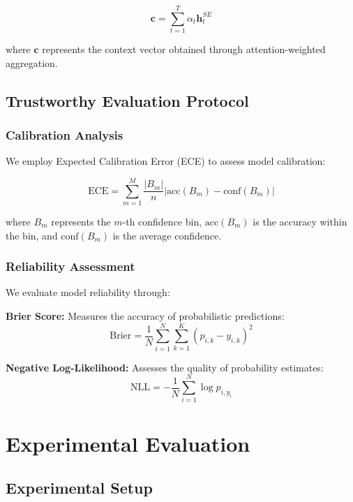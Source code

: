 \documentclass[journal]{IEEEtran}
\begin{document}
\begin{equation}
\mathbf{c} = \sum_{t=1}^{T} \alpha_t \mathbf{h}_t^{SE}
\end{equation}

where $\mathbf{c}$ represents the context vector obtained through attention-weighted aggregation.

\subsection{Trustworthy Evaluation Protocol}

\subsubsection{Calibration Analysis}

We employ Expected Calibration Error (ECE) to assess model calibration:

\begin{equation}
\text{ECE} = \sum_{m=1}^{M} \frac{|B_m|}{n} |\text{acc}(B_m) - \text{conf}(B_m)|
\end{equation}

where $B_m$ represents the $m$-th confidence bin, $\text{acc}(B_m)$ is the accuracy within the bin, and $\text{conf}(B_m)$ is the average confidence.

\subsubsection{Reliability Assessment}

We evaluate model reliability through:

\textbf{Brier Score:} Measures the accuracy of probabilistic predictions:
\begin{equation}
\text{Brier} = \frac{1}{N} \sum_{i=1}^{N} \sum_{k=1}^{K} (p_{i,k} - y_{i,k})^2
\end{equation}

\textbf{Negative Log-Likelihood:} Assesses the quality of probability estimates:
\begin{equation}
\text{NLL} = -\frac{1}{N} \sum_{i=1}^{N} \log p_{i,y_i}
\end{equation}

\section{Experimental Evaluation}

\subsection{Experimental Setup}
\end{document}
